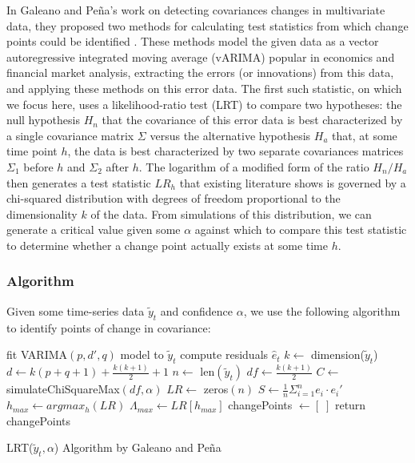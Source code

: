 \documentclass[conference,letterpaper]{IEEEtran}
\begin{document}
In Galeano and Pe\~{n}a's work on detecting covariances changes in multivariate data, they proposed two methods for calculating test statistics from which change points could be identified \cite{galeano2007covariance}. 
These methods model the given data as a vector autoregressive integrated moving average (vARIMA) popular in economics and financial market analysis, extracting the errors (or innovations) from this data, and applying these methods on this error data.
The first such statistic, on which we focus here, uses a likelihood-ratio test (LRT) to compare two hypotheses: the null hypothesis $H_n$ that the covariance of this error data is best characterized by a single covariance matrix $\Sigma$ versus the alternative hypothesis $H_a$ that, at some time point $h$, the data is best characterized by two separate covariances matrices $\Sigma_1$ before $h$ and $\Sigma_2$ after $h$.
The logarithm of a modified form of the ratio $H_n/H_a$ then generates a test statistic $LR_{h}$ that existing literature shows is governed by a chi-squared distribution with degrees of freedom proportional to the dimensionality $k$ of the data.
From simulations of this distribution, we can generate a critical value given some $\alpha$ against which to compare this test statistic to determine whether a change point actually exists at some time $h$.

\subsubsection{Algorithm}

Given some time-series data $\tilde{y}_t$ and confidence $\alpha$, we use the following algorithm to identify points of change in covariance:

\begin{function}
	\SetAlgoLined
	fit VARIMA$(p, d', q)$ model to $\tilde{y}_t$ \;
	compute residuals $\hat e_t$ \;
	\BlankLine
	$k \gets$ dimension($\tilde{y}_t$) \;
	$d \gets k(p + q + 1) + \frac{k(k+1)}{2} + 1$  
	$n \gets$ len$(\tilde{y}_t)$ \;
	$df \gets \frac{k(k+1)}{2}$  
	\BlankLine
	$C \gets $ simulateChiSquareMax$(df, \alpha)$  
	\BlankLine
	$LR \gets $ zeros$(n)$ \;
	$S \gets \frac{1}{n} \Sigma_{i=1}^n e_i \cdot e_i'$ \;
	\BlankLine
	$h_{max} \gets argmax_h(LR) $ \;
	$\Lambda_{max} \gets LR[h_{max}]$ \;
	\BlankLine
	changePoints $\gets [\;]$ \;
	\BlankLine
	return changePoints
 \caption{LRT($\tilde{y}_t, \alpha$) Algorithm by Galeano and Pe\~{n}a \cite{galeano2007covariance}}
\end{function}
\end{document}
